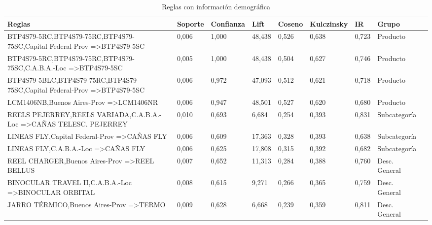 \documentclass[]{article}
\begin{document}
 \begin{landscape}
 	\begin{table}[h]
 		\centering
 		\caption{Reglas con información demográfica}
 		\label{Tab_Reg_Demog}
 		\begin{tabular}{lllllllll}
 			\textbf{Reglas}                                     & \textbf{Soporte} & \textbf{Confianza}& \textbf{Lift} & \textbf{Coseno}  & \textbf{Kulczinsky}  & \textbf{IR} & \textbf{Grupo}                &  \\
 			\hline
 			BTP4S79-5RC,BTP4S79-75RC,BTP4S79-75SC,Capital Federal-Prov =\textgreater BTP4S79-5SC  & 0,006   & 1,000      & 48,438 & 0,526  & 0,638      & 0,723 & Producto            &  \\
 			BTP4S79-5RC,BTP4S79-75RC,BTP4S79-75SC,C.A.B.A.-Loc =\textgreater BTP4S79-5SC          & 0,005   & 1,000      & 48,438 & 0,504  & 0,627      & 0,746 & Producto            &  \\
 			BTP4S79-5BLC,BTP4S79-75RC,BTP4S79-75SC,Capital Federal-Prov =\textgreater BTP4S79-5SC & 0,006   & 0,972      & 47,093 & 0,512  & 0,621      & 0,718 & Producto            &  \\
 			LCM1406NB,Buenos Aires-Prov =\textgreater LCM1406NR                                   & 0,006   & 0,947      & 48,501 & 0,527  & 0,620      & 0,680 & Producto            &  \\
 			REELS PEJERREY,REELS VARIADA,C.A.B.A.-Loc =\textgreater CAÑAS TELESC. PEJERREY        & 0,010   & 0,693      & 6,684  & 0,254  & 0,393      & 0,831 & Subcategoría        &  \\
 			LINEAS FLY,Capital Federal-Prov =\textgreater CAÑAS FLY                               & 0,006   & 0,609      & 17,363 & 0,328  & 0,393      & 0,638 & Subcategoría        &  \\
 			LINEAS FLY,C.A.B.A.-Loc =\textgreater CAÑAS FLY                                       & 0,006   & 0,625      & 17,808 & 0,315  & 0,392      & 0,682 & Subcategoría        &  \\
 			REEL CHARGER,Buenos Aires-Prov =\textgreater REEL BELLUS                              & 0,007   & 0,652      & 11,313 & 0,284  & 0,388      & 0,760 & Desc. General &  \\
 			BINOCULAR TRAVEL II,C.A.B.A.-Loc =\textgreater BINOCULAR ORBITAL                      & 0,008   & 0,615      & 9,271  & 0,266  & 0,365      & 0,759 & Desc. General &  \\
 			JARRO TÉRMICO,Buenos Aires-Prov =\textgreater TERMO                                   & 0,009   & 0,628      & 6,668  & 0,239  & 0,359      & 0,811 & Desc. General &  \\

\end{tabular}
\end{table}
\end{landscape}
\end{document}
